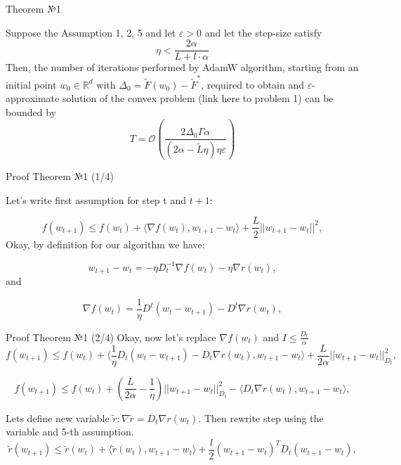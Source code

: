 \documentclass[aspectratio=169, 12pt]{beamer}
\begin{document}
\begin{frame}{Theorem №1}
\begin{theorem}[1]
Suppose the Assumption 1, 2, 5 and let $\varepsilon > 0$ and let the step-size satisfy
\begin{equation*}
    \eta < \frac{2 \alpha}{L + l \cdot \alpha} 
\end{equation*}
Then, the number of iterations performed by AdamW algorithm, starting from an initial point $w_0 \in \mathbb{R}^d$ with $\Delta_0 = \tilde{F}(w_0) - \tilde{F}^*$, required to obtain and $\varepsilon$-approximate solution of the convex problem (link here to problem 1) can be bounded by
\begin{equation*}
      T = \mathcal{O}\left( \frac{2\Delta_0 \Gamma \alpha } {(2\alpha - \tilde{L}\eta) \eta \varepsilon} \right)
\end{equation*}

\end{theorem}
\end{frame}
\begin{frame}{Proof Theorem №1 (1/4)}
    
Let's write first assumption for step t and $t+1$:

\begin{equation*}
    f(w_{t+1}) \leq f(w_t) + \langle \nabla f(w_t), w_{t+1} - w_t \rangle + \frac{L}{2}||w_{t+1} - w_t ||^2,
\end{equation*}
Okay, by definition for our algorithm we have:

\begin{equation*}
w_{t+1} - w_t = -\eta D_t^{-1} \nabla f(w_t) - \eta \nabla r(w_t),
\end{equation*}
and 

\begin{equation*}
\nabla f(w_t) = \frac{1}{\eta} D^t(w_t - w_{t+1}) - D^t \nabla r(w_t),
\end{equation*}

\end{frame}

\begin{frame}{Proof Theorem №1 (2/4)}
    Okay, now let's replace $\nabla f(w_t)$ and $I \leq \frac{D_t}{\alpha}$
\begin{equation*}
    f(w_{t+1}) \leq f(w_t) + \langle \frac{1}{\eta}D_t(w_t - w_{t+1}) - D_t\nabla r(w_t), w_{t+1} - w_t \rangle + \frac{L}{2 \alpha} ||w_{t+1} - w_t||_{D_t}^2,
\end{equation*}

\begin{equation*}
    f(w_{t+1}) \leq f(w_t) + \left(\frac{L}{2 \alpha} - \frac{1}{\eta} \right) ||w_{t+1} - w_t||_{D_t}^2 - \langle D_t \nabla r(w_t), w_{t+1} - w_t \rangle,
\end{equation*}

Lets define new variable $\tilde{r} : \nabla \tilde{r} = D_t \nabla r(w_t)$. Then rewrite step using the variable and 5-th assumption.
\begin{equation*}
    \tilde{r}(w_{t+1}) \leq \tilde{r}(w_t) + \langle \tilde{r}(w_t), w_{t+1} - w_t \rangle + \frac{l}{2} (w_{t+1} - w_t)^T D_t (w_{t+1} - w_t),
\end{equation*}
\end{frame}
\end{document}
